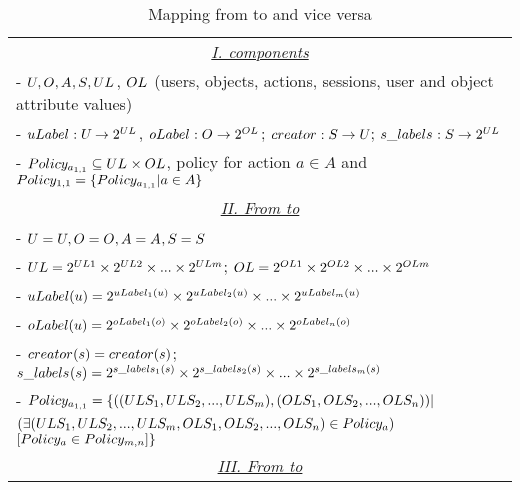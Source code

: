 \newcommand{\denom}{\empty}
\newcommand{\suffix}{\empty}
\newcommand{\suffixTwo}{\empty}
\begin{table}
	\centering
	\caption{ Mapping from \EPMNModel{} to \EPOneOneModels{} and vice versa } %
	\label{tab:mapping-epmn-ep11}
	\begin{tabular}{|l|}						
		\hline					
			\multicolumn{1}{|c|}{\underline{\textit{I. \EPOneOneModels{}  components}}} \\
			-  $U_{\suffix}, O_{\suffix},  A_{\suffix}, S_{\suffix}, UL_{\suffix}$, $OL_{\suffix}$ (users, objects, actions, sessions, user and object attribute values) \\ 				  
			-  $\uLabel_{\suffix}: U_{\suffix} \to 2^{UL_{\suffix}}$, $\oLabel_{\suffix}: O_{\suffix} \to 2^{OL_{\suffix}}$; $\creator_{\suffix}: S_{\suffix} \to U_{\suffix}$; $\sessionLabels_{\suffix}: S_{\suffix} \to 2^{UL_{\suffix}}$ \\
			- $\Policy_{a_{1,1}} \subseteq {UL_{\suffix}} \times {OL_{\suffix}}$, policy for action $a \in A$ and $Policy_{1,1} = \{Policy_{a_{1,1}}| a \in A\}$\\
		   
	 \multicolumn{1}{|c|}{\underline{\textit{II. From \EPMNModel{} to \EPOneOneModels{}}}}\\	
			- $U = U_\denom{}, O = O_\denom{}, A = A_\denom{}, S_{\suffixTwo{}} = S$ \\
			- $UL = 2^{UL{1}} \times 2^{UL{2}} \times ... \times 2^{UL{m}}$; $OL = 2^{OL{1}} \times 2^{OL{2}} \times ... \times 2^{OL{m}}$\\  
			- $uLabel(u) = 2^{uLabel_{1}(u)} \times 2^{uLabel_{2}(u)} \times ... \times 2^{uLabel_{m}(u)} $\\
			- $oLabel(u) = 2^{oLabel_{1}(o)} \times 2^{oLabel_{2}(o)} \times ... \times 2^{oLabel_{n}(o)} $ \\
		
			- $\creator_{\suffixTwo}(s) = \creator(s)$; $\sessionLabels_{\suffixTwo{}}(s) = 2^{\sessionLabelsP{1}(s)} \times 2^{\sessionLabelsP{2}(s)} \times ... \times 2^{\sessionLabelsP{m}(s)}$\\
			
			-  $Policy_{a_{1,1}}= \{( (ULS_{1},  ULS_{2}, ..., ULS_{m}),  (OLS_{1}, OLS_{2}, ..., OLS_{n}))|$ \\ \hfill $(\exists (ULS_{1}, ULS_{2}, ...,ULS_{m},  OLS_{1}, OLS_{2}, ...,OLS_{n}) \in Policy_a  )$ $[ Policy_a \in Policy_{m,n}]\}$ \\
			\multicolumn{1}{|c|}{\underline{\textit{III. From \EPOneOneModels{} to \EPMNModel{}}}}\\	
			

\end{tabular}
\end{table}
